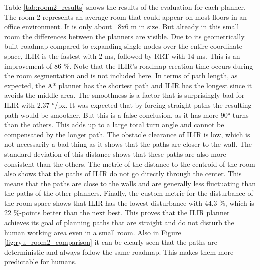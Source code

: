 Table \ref{tab:room2_results} shows the results of the evaluation for each planner. The room 2 represents an average room that could appear on most floors in an office environment. It is only about ~8x6 m in size. But already in this small room the differences between the planners are visible. Due to its geometrically built roadmap compared to expanding single nodes over the entire coordinate space, ILIR is the fastest with 2 ms, followed by RRT with 14 ms. This is an improvement of 86 \%. Note that the ILIR's roadmap creation time occurs during the room segmentation and is not included here. In terms of path length, as expected, the A* planner has the shortest path and ILIR has the longest since it avoids the middle area. The smoothness is a factor that is surprisingly bad for ILIR with 2.37 °/px. It was expected that by forcing straight paths the resulting path would be smoother. But this is a false conclusion, as it has more 90° turns than the others. This adds up to a large total turn angle and cannot be compensated by the longer path. The obstacle clearance of ILIR is low, which is not necessarily a bad thing as it shows that the paths are closer to the wall. The standard deviation of this distance shows that these paths are also more consistent than the others. The metric of the distance to the centroid of the room also shows that the paths of ILIR do not go directly through the center. This means that the paths are close to the walls and are generally less fluctuating than the paths of the other planners. Finally, the custom metric for the disturbance of the room space shows that ILIR has the lowest disturbance with 44.3 \%, which is 22 \%-points better than the next best. This proves that the ILIR planner achieves its goal of planning paths that are straight and do not disturb the human working area even in a small room. Also in Figure \ref{fig:ryu_room2_comparison} it can be clearly seen that the paths are deterministic and always follow the same roadmap. This makes them more predictable for humans.

